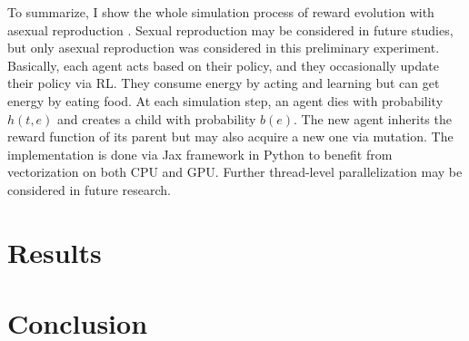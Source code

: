 To summarize, I show the whole simulation process of reward evolution with asexual reproduction . Sexual reproduction may be considered in future studies, but only asexual reproduction was considered in this preliminary experiment. Basically, each agent acts based on their policy, and they occasionally update their policy via RL. They consume energy by acting and learning but can get energy by eating food. At each simulation step, an agent dies with probability $h(t, e)$ and creates a child with probability $b(e)$. The new agent inherits the reward function of its parent but may also acquire a new one via mutation. The implementation is done via Jax framework\citep{jax2018github} in Python to benefit from vectorization on both CPU and GPU. Further thread-level parallelization may be considered in future research.


\section{Results}

\section{Conclusion}